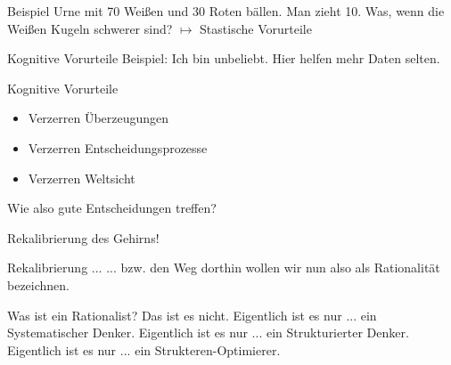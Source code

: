 \begin{frame}[c]{Beispiel}
    \pause
    Urne mit 70 Weißen und 30 Roten bällen. \newline
    \newline \pause
    Man zieht 10. \newline
    \newline \pause
    Was, wenn die Weißen Kugeln schwerer sind? \newline
    \newline \pause
    $\mapsto$ Stastische Vorurteile
\end{frame}


\begin{frame}[c]{Kognitive Vorurteile}
    \pause
    Beispiel: Ich bin unbeliebt. \newline
    \newline \pause
    Hier helfen mehr Daten selten.
\end{frame}


\begin{frame}[c]{Kognitive Vorurteile}
    \begin{itemize}
        \pause
        \item Verzerren Überzeugungen
        \pause
        \item Verzerren Entscheidungsprozesse
        \pause
        \item Verzerren Weltsicht \newline
        \pause
    \end{itemize}
    Wie also gute Entscheidungen treffen? \newline \pause
\end{frame}


\begin{frame}[standout]
    Rekalibrierung des Gehirns!
\end{frame}


\begin{frame}[c]{Rekalibrierung ...}
    $...$ bzw. den Weg dorthin wollen wir nun also als Rationalität bezeichnen.
\end{frame}


\begin{frame}[c]{Was ist ein Rationalist?}
    Das ist es nicht. \newline
    Eigentlich ist es nur $...$ ein Systematischer Denker.
    Eigentlich ist es nur $...$ ein Strukturierter Denker.
    Eigentlich ist es nur $...$ ein Strukteren-Optimierer.
\end{frame}


